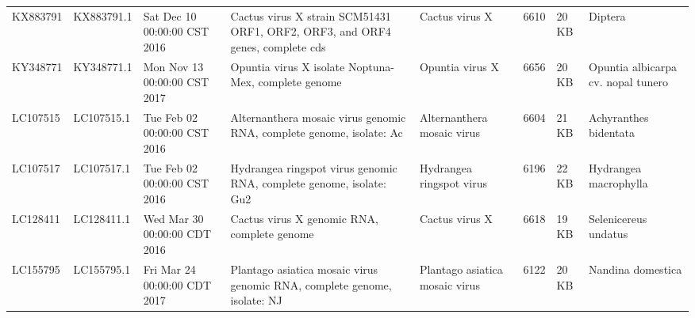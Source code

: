 \documentclass[11pt]{article}
\begin{document}
\begin{supptable}[ht]
{{\begin{tabular}{@{}llllllll@{}}
KX883791 & KX883791.1 & Sat Dec 10 00:00:00 CST 2016 & Cactus virus X strain SCM51431 ORF1, ORF2, ORF3, and ORF4 genes, complete cds                                                                                                                                                                                    & Cactus virus X                 & 6610            & 20 KB & Diptera                               \\
KY348771 & KY348771.1 & Mon Nov 13 00:00:00 CST 2017 & Opuntia virus X isolate Noptuna-Mex, complete genome                                                                                                                                                                                                             & Opuntia virus X                & 6656            & 20 KB & Opuntia albicarpa cv. nopal tunero    \\
LC107515 & LC107515.1 & Tue Feb 02 00:00:00 CST 2016 & Alternanthera mosaic virus genomic RNA, complete genome, isolate: Ac                                                                                                                                                                                             & Alternanthera mosaic virus     & 6604            & 21 KB & Achyranthes bidentata                 \\
LC107517 & LC107517.1 & Tue Feb 02 00:00:00 CST 2016 & Hydrangea ringspot virus genomic RNA, complete genome, isolate: Gu2                                                                                                                                                                                              & Hydrangea ringspot virus       & 6196            & 22 KB & Hydrangea macrophylla                 \\
LC128411 & LC128411.1 & Wed Mar 30 00:00:00 CDT 2016 & Cactus virus X genomic RNA, complete genome                                                                                                                                                                                                                      & Cactus virus X                 & 6618            & 19 KB & Selenicereus undatus                    \\
LC155795 & LC155795.1 & Fri Mar 24 00:00:00 CDT 2017 & Plantago asiatica mosaic virus genomic RNA, complete genome, isolate: NJ                                                                                                                                                                                         & Plantago asiatica mosaic virus & 6122            & 20 KB & Nandina domestica                     \\

\end{tabular}}}
\end{supptable}
\end{document}
